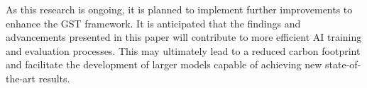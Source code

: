 \documentclass{article}
\begin{document}
As this research is ongoing, it is planned to implement further improvements to enhance the GST framework. It is anticipated that the findings and advancements presented in this paper will contribute to more efficient AI training and evaluation processes. This may ultimately lead to a reduced carbon footprint and facilitate the development of larger models capable of achieving new state-of-the-art results.

\newpage


\end{document}
